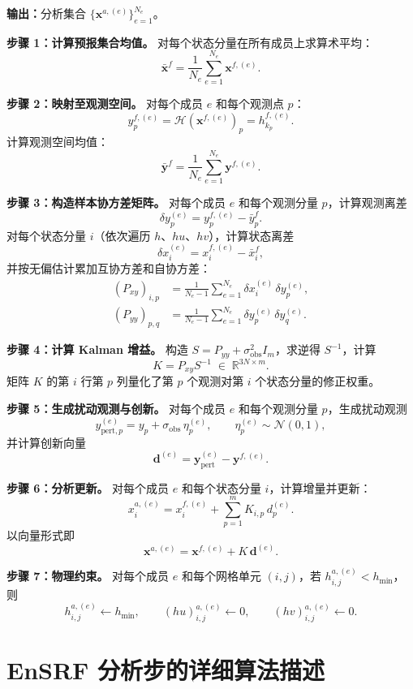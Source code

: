 \documentclass[12pt,a4paper]{article}
\newcommand{\x}{\bm{x}}
\newcommand{\y}{\bm{y}}
\newcommand{\R}{\mathbb{R}}
\newcommand{\calH}{\mathcal{H}}
\begin{document}
\medskip\noindent
\textbf{输出：}分析集合 $\{\x^{a,(e)}\}_{e=1}^{N_e}$。

\medskip\noindent
\textbf{步骤 1：计算预报集合均值。}
对每个状态分量在所有成员上求算术平均：
\[
  \bar{\x}^f = \frac{1}{N_e}\sum_{e=1}^{N_e} \x^{f,(e)}.
\]

\medskip\noindent
\textbf{步骤 2：映射至观测空间。}
对每个成员 $e$ 和每个观测点 $p$：
\[
  y_p^{f,(e)} = \calH(\x^{f,(e)})_p = h_{k_p}^{f,(e)}.
\]
计算观测空间均值：
\[
  \bar{\y}^f = \frac{1}{N_e}\sum_{e=1}^{N_e} \y^{f,(e)}.
\]

\medskip\noindent
\textbf{步骤 3：构造样本协方差矩阵。}
对每个成员 $e$ 和每个观测分量 $p$，计算观测离差
\[
  \delta y_p^{(e)} = y_p^{f,(e)} - \bar{y}_p^f.
\]
对每个状态分量 $i$（依次遍历 $h$、$hu$、$hv$），计算状态离差
\[
  \delta x_i^{(e)} = x_i^{f,(e)} - \bar{x}_i^f,
\]
并按无偏估计累加互协方差和自协方差：
\begin{align*}
  (P_{xy})_{i,p} &= \frac{1}{N_e-1}\sum_{e=1}^{N_e} \delta x_i^{(e)}\,\delta y_p^{(e)}, \\[4pt]
  (P_{yy})_{p,q} &= \frac{1}{N_e-1}\sum_{e=1}^{N_e} \delta y_p^{(e)}\,\delta y_q^{(e)}.
\end{align*}

\medskip\noindent
\textbf{步骤 4：计算 Kalman 增益。}
构造 $S = P_{yy} + \sigma_{\mathrm{obs}}^2 I_m$，求逆得 $S^{-1}$，计算
\[
  K = P_{xy} S^{-1} \;\in\; \R^{3N \times m}.
\]
矩阵 $K$ 的第 $i$ 行第 $p$ 列量化了第 $p$ 个观测对第 $i$ 个状态分量的修正权重。

\medskip\noindent
\textbf{步骤 5：生成扰动观测与创新。}
对每个成员 $e$ 和每个观测分量 $p$，生成扰动观测
\[
  y_{\mathrm{pert},p}^{(e)} = y_p + \sigma_{\mathrm{obs}}\,\eta_p^{(e)},
  \qquad \eta_p^{(e)} \sim \mathcal{N}(0,1),
\]
并计算创新向量
\[
  \mathbf{d}^{(e)} = \y_{\mathrm{pert}}^{(e)} - \y^{f,(e)}.
\]

\medskip\noindent
\textbf{步骤 6：分析更新。}
对每个成员 $e$ 和每个状态分量 $i$，计算增量并更新：
\[
  x_i^{a,(e)} = x_i^{f,(e)} + \sum_{p=1}^{m} K_{i,p}\,d_p^{(e)}.
\]
以向量形式即
\[
  \x^{a,(e)} = \x^{f,(e)} + K\,\mathbf{d}^{(e)}.
\]

\medskip\noindent
\textbf{步骤 7：物理约束。}
对每个成员 $e$ 和每个网格单元 $(i,j)$，若 $h_{i,j}^{a,(e)} < h_{\min}$，则
\[
  h_{i,j}^{a,(e)} \leftarrow h_{\min},\qquad
  (hu)_{i,j}^{a,(e)} \leftarrow 0,\qquad
  (hv)_{i,j}^{a,(e)} \leftarrow 0.
\]

\section{EnSRF 分析步的详细算法描述}
\label{app:ensrf}
\end{document}
